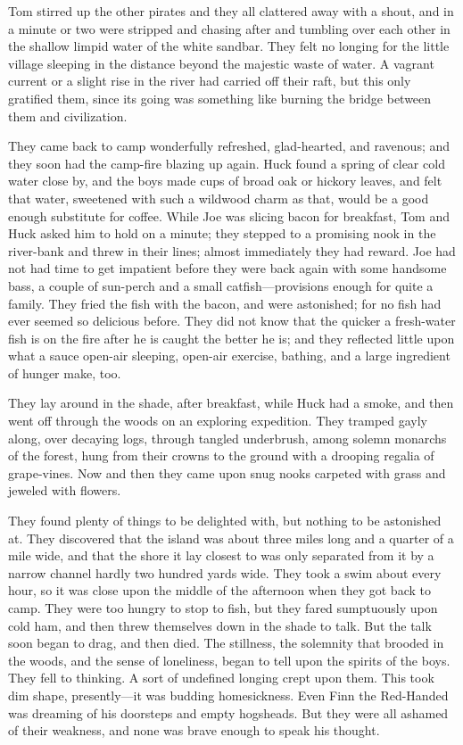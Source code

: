 \documentclass{book}
\begin{document}
Tom stirred up the other pirates and they all clattered away with a shout, and in a minute or two were stripped and chasing after and tumbling over each other in the shallow limpid water of the white sandbar. They felt no longing for the little village sleeping in the distance beyond the majestic waste of water. A vagrant current or a slight rise in the river had carried off their raft, but this only gratified them, since its going was something like burning the bridge between them and civilization.

They came back to camp wonderfully refreshed, glad-hearted, and ravenous; and they soon had the camp-fire blazing up again. Huck found a spring of clear cold water close by, and the boys made cups of broad oak or hickory leaves, and felt that water, sweetened with such a wildwood charm as that, would be a good enough substitute for coffee. While Joe was slicing bacon for breakfast, Tom and Huck asked him to hold on a minute; they stepped to a promising nook in the river-bank and threw in their lines; almost immediately they had reward. Joe had not had time to get impatient before they were back again with some handsome bass, a couple of sun-perch and a small catfish—provisions enough for quite a family. They fried the fish with the bacon, and were astonished; for no fish had ever seemed so delicious before. They did not know that the quicker a fresh-water fish is on the fire after he is caught the better he is; and they reflected little upon what a sauce open-air sleeping, open-air exercise, bathing, and a large ingredient of hunger make, too.

They lay around in the shade, after breakfast, while Huck had a smoke, and then went off through the woods on an exploring expedition. They tramped gayly along, over decaying logs, through tangled underbrush, among solemn monarchs of the forest, hung from their crowns to the ground with a drooping regalia of grape-vines. Now and then they came upon snug nooks carpeted with grass and jeweled with flowers.

They found plenty of things to be delighted with, but nothing to be astonished at. They discovered that the island was about three miles long and a quarter of a mile wide, and that the shore it lay closest to was only separated from it by a narrow channel hardly two hundred yards wide. They took a swim about every hour, so it was close upon the middle of the afternoon when they got back to camp. They were too hungry to stop to fish, but they fared sumptuously upon cold ham, and then threw themselves down in the shade to talk. But the talk soon began to drag, and then died. The stillness, the solemnity that brooded in the woods, and the sense of loneliness, began to tell upon the spirits of the boys. They fell to thinking. A sort of undefined longing crept upon them. This took dim shape, presently—it was budding homesickness. Even Finn the Red-Handed was dreaming of his doorsteps and empty hogsheads. But they were all ashamed of their weakness, and none was brave enough to speak his thought.
\end{document}
